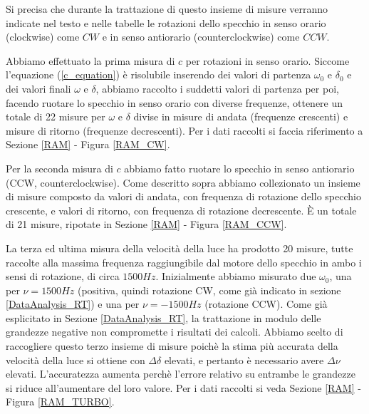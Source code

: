 \documentclass{article}
\begin{document}
\vspace{3mm}

Si precisa che durante la trattazione di questo insieme di misure verranno indicate nel testo e nelle tabelle le rotazioni dello specchio in senso orario (clockwise) come 
$CW$ e in senso antiorario (counterclockwise) come $CCW$.

\vspace{3mm}

Abbiamo effettuato la prima misura di $c$ per rotazioni in senso orario.
Siccome l'equazione (\ref{c_equation}) è risolubile inserendo dei valori di partenza $\omega_0$ e $\delta_0$ e dei valori finali $\omega$ e $\delta$, abbiamo raccolto
i suddetti valori di partenza per poi, facendo ruotare lo specchio in senso orario con diverse frequenze, ottenere un totale di 22 misure per $\omega$ e $\delta$ divise
in misure di andata (frequenze crescenti) e misure di ritorno (frequenze decrescenti). Per i dati raccolti si faccia riferimento a Sezione \ref{RAM} - Figura \ref{RAM_CW}.

\vspace{3mm}

Per la seconda misura di $c$ abbiamo fatto ruotare lo specchio in senso antiorario (CCW, counterclockwise). Come descritto sopra abbiamo collezionato un insieme di
misure composto da valori di andata, con frequenza di rotazione dello specchio crescente, e valori di ritorno, con frequenza di rotazione decrescente. È un 
totale di 21 misure, ripotate in Sezione \ref{RAM} - Figura \ref{RAM_CCW}.

\vspace{3mm}

La terza ed ultima misura della velocità della luce ha prodotto 20 misure, tutte raccolte alla massima frequenza raggiungibile dal motore dello specchio in ambo i sensi di
rotazione, di circa $1500Hz$.
Inizialmente abbiamo misurato due $\omega_0$, una per $\nu=1500 Hz$ (positiva, quindi rotazione CW, come già indicato in sezione \ref{DataAnalysis_RT}) e una per $\nu=-
1500Hz$ (rotazione CCW). Come già esplicitato in Sezione \ref{DataAnalysis_RT}, la trattazione in modulo delle grandezze negative non compromette i risultati dei calcoli. 
Abbiamo scelto di raccogliere questo terzo insieme di misure poichè la stima più accurata della velocità della luce si ottiene con $\Delta\delta$ elevati, e pertanto è 
necessario avere $\Delta\nu$ elevati. L'accuratezza aumenta perchè l'errore relativo su entrambe le grandezze si riduce all'aumentare del loro valore.
Per i dati raccolti si veda Sezione \ref{RAM} - Figura \ref{RAM_TURBO}.
\end{document}
